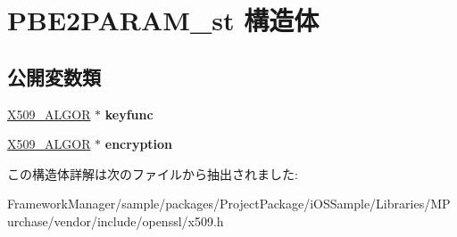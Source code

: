 \hypertarget{struct_p_b_e2_p_a_r_a_m__st}{}\section{P\+B\+E2\+P\+A\+R\+A\+M\+\_\+st 構造体}
\label{struct_p_b_e2_p_a_r_a_m__st}
\subsection*{公開変数類}
\begin{DoxyCompactItemize}
\item 
\hypertarget{struct_p_b_e2_p_a_r_a_m__st_a25475b98a4fde64162ffd0b124be4a62}{}\hyperlink{struct_x509__algor__st}{X509\+\_\+\+A\+L\+G\+O\+R} $\ast$ {\bfseries keyfunc}\label{struct_p_b_e2_p_a_r_a_m__st_a25475b98a4fde64162ffd0b124be4a62}

\item 
\hypertarget{struct_p_b_e2_p_a_r_a_m__st_a72b700e16f2dc2f87e2caa6cdce6a1c8}{}\hyperlink{struct_x509__algor__st}{X509\+\_\+\+A\+L\+G\+O\+R} $\ast$ {\bfseries encryption}\label{struct_p_b_e2_p_a_r_a_m__st_a72b700e16f2dc2f87e2caa6cdce6a1c8}

\end{DoxyCompactItemize}


この構造体詳解は次のファイルから抽出されました\+:\begin{DoxyCompactItemize}
\item 
Framework\+Manager/sample/packages/\+Project\+Package/i\+O\+S\+Sample/\+Libraries/\+M\+Purchase/vendor/include/openssl/x509.\+h\end{DoxyCompactItemize}
